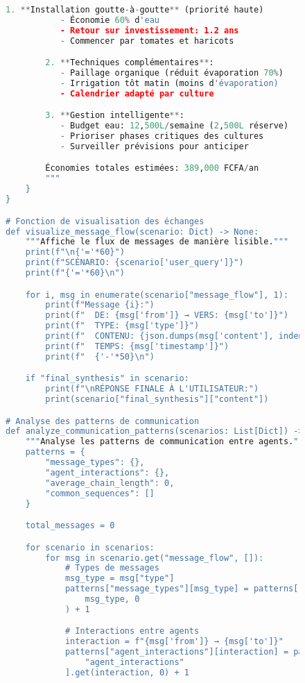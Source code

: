 \begin{figure}[H]
\begin{lstlisting}[language=Python, caption=Exemples de communications inter-agents en action]
        1. **Installation goutte-à-goutte** (priorité haute)
           - Économie 60% d'eau
           - Retour sur investissement: 1.2 ans
           - Commencer par tomates et haricots

        2. **Techniques complémentaires**:
           - Paillage organique (réduit évaporation 70%)
           - Irrigation tôt matin (moins d'évaporation)
           - Calendrier adapté par culture

        3. **Gestion intelligente**:
           - Budget eau: 12,500L/semaine (2,500L réserve)
           - Prioriser phases critiques des cultures
           - Surveiller prévisions pour anticiper

        Économies totales estimées: 389,000 FCFA/an
        """
    }
}

# Fonction de visualisation des échanges
def visualize_message_flow(scenario: Dict) -> None:
    """Affiche le flux de messages de manière lisible."""
    print(f"\n{'='*60}")
    print(f"SCÉNARIO: {scenario['user_query']}")
    print(f"{'='*60}\n")

    for i, msg in enumerate(scenario["message_flow"], 1):
        print(f"Message {i}:")
        print(f"  DE: {msg['from']} → VERS: {msg['to']}")
        print(f"  TYPE: {msg['type']}")
        print(f"  CONTENU: {json.dumps(msg['content'], indent=4, ensure_ascii=False)}")
        print(f"  TEMPS: {msg['timestamp']}")
        print(f"  {'-'*50}\n")

    if "final_synthesis" in scenario:
        print(f"\nRÉPONSE FINALE À L'UTILISATEUR:")
        print(scenario["final_synthesis"]["content"])

# Analyse des patterns de communication
def analyze_communication_patterns(scenarios: List[Dict]) -> Dict:
    """Analyse les patterns de communication entre agents."""
    patterns = {
        "message_types": {},
        "agent_interactions": {},
        "average_chain_length": 0,
        "common_sequences": []
    }

    total_messages = 0

    for scenario in scenarios:
        for msg in scenario.get("message_flow", []):
            # Types de messages
            msg_type = msg["type"]
            patterns["message_types"][msg_type] = patterns["message_types"].get(
                msg_type, 0
            ) + 1

            # Interactions entre agents
            interaction = f"{msg['from']} → {msg['to']}"
            patterns["agent_interactions"][interaction] = patterns[
                "agent_interactions"
            ].get(interaction, 0) + 1


\end{lstlisting}
\end{figure}
